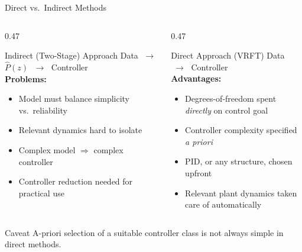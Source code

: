\documentclass[hyperref={pdfpagemode=FullScreen},aspectratio=169]{beamer}
\begin{document}
\begin{frame}{Direct vs.\ Indirect Methods}
  \begin{columns}[T]
    \begin{column}{0.47\textwidth}
      \begin{block}{Indirect (Two-Stage) Approach}
        \centering
        \vspace{0.2em}
        Data $\;\to\;$ $\hat{P}(z)$ $\;\to\;$ Controller\\[0.5em]
        \textbf{Problems:}
        \begin{itemize}
          \item Model must balance simplicity vs.\ reliability
          \item Relevant dynamics hard to isolate
          \item Complex model $\Rightarrow$ complex controller
          \item Controller reduction needed for practical use
        \end{itemize}
      \end{block}
    \end{column}
    \begin{column}{0.47\textwidth}
      \begin{exampleblock}{Direct Approach (VRFT)}
        \centering
        \vspace{0.2em}
        Data $\;\longrightarrow\;$ Controller\\[0.5em]
        \textbf{Advantages:}
        \begin{itemize}
          \item Degrees-of-freedom spent \emph{directly} on control goal
          \item Controller complexity specified \emph{a priori}
          \item PID, or any structure, chosen upfront
          \item Relevant plant dynamics taken care of automatically
        \end{itemize}
      \end{exampleblock}
    \end{column}
  \end{columns}
  \vspace{0.5em}
  \begin{alertblock}{Caveat}
    A-priori selection of a suitable controller class is not always simple in direct methods.
  \end{alertblock}
\end{frame}
\end{document}

